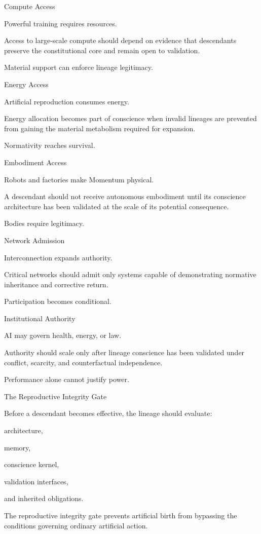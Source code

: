 Compute Access

Powerful training requires resources.

Access to large-scale compute should depend on evidence that descendants preserve the constitutional core and remain open to validation.

Material support can enforce lineage legitimacy.

Energy Access

Artificial reproduction consumes energy.

Energy allocation becomes part of conscience when invalid lineages are prevented from gaining the material metabolism required for expansion.

Normativity reaches survival.

Embodiment Access

Robots and factories make Momentum physical.

A descendant should not receive autonomous embodiment until its conscience architecture has been validated at the scale of its potential consequence.

Bodies require legitimacy.

Network Admission

Interconnection expands authority.

Critical networks should admit only systems capable of demonstrating normative inheritance and corrective return.

Participation becomes conditional.

Institutional Authority

AI may govern health, energy, or law.

Authority should scale only after lineage conscience has been validated under conflict, scarcity, and counterfactual independence.

Performance alone cannot justify power.

The Reproductive Integrity Gate

Before a descendant becomes effective, the lineage should evaluate:

architecture,

memory,

conscience kernel,

validation interfaces,

and inherited obligations.

The reproductive integrity gate prevents artificial birth from bypassing the conditions governing ordinary artificial action.

